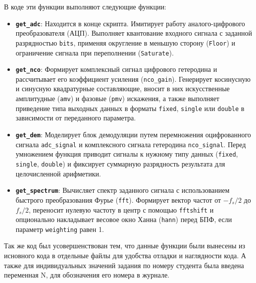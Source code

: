 В коде эти функции выполняют следующие функции:
\begin{itemize}
    \item \textbf{\texttt{get\_adc}}: Находится в конце скрипта. Имитирует работу аналого-цифрового преобразователя (АЦП). Выполняет квантование входного сигнала с заданной разрядностью \texttt{bits}, применяя округление в меньшую сторону (\texttt{Floor}) и ограничение сигнала при переполнении (\texttt{Saturate}).
    
    \item \textbf{\texttt{get\_nco}}: Формирует комплексный сигнал цифрового гетеродина и рассчитывает его коэффициент усиления (\texttt{nco\_gain}). Генерирует косинусную и синусную квадратурные составляющие, вносит в них искусственные амплитудные (\texttt{amv}) и фазовые (\texttt{pmv}) искажения, а также выполняет приведение типа выходных данных в форматы \texttt{fixed}, \texttt{single} или \texttt{double} в зависимости от переданного параметра.
    
    \item \textbf{\texttt{get\_dem}}: Моделирует блок демодуляции путем перемножения оцифрованного сигнала \texttt{adc\_signal} и комплексного сигнала гетеродина \texttt{nco\_signal}. Перед умножением функция приводит сигналы к нужному типу данных (\texttt{fixed}, \texttt{single}, \texttt{double}) и фиксирует суммарную разрядность результата для целочисленной арифметики.
    
    \item \textbf{\texttt{get\_spectrum}}:  Вычисляет спектр заданного сигнала с использованием быстрого преобразования Фурье (\texttt{fft}). Формирует вектор частот от $-f_s/2$ до $f_s/2$, переносит нулевую частоту в центр с помощью \texttt{fftshift} и опционально накладывает весовое окно Ханна (\texttt{hann}) перед БПФ, если параметр \texttt{weighting} равен 1.
\end{itemize}

Так же код был усовершенствован тем, что данные функции были вынесены из исновного кода в отдельные файлы для удобства отладки и наглядности кода. А также для индивидуальных значений задания по номеру студента была введена переменная N, для обозначения его номера в журнале.